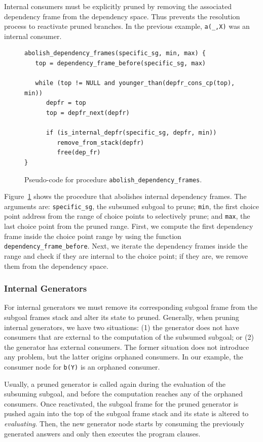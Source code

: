 Internal consumers must be explicitly pruned by removing the associated
dependency frame from the dependency space. Thus prevents the resolution process to reactivate pruned
branches. In the previous example, \texttt{a(\_,X)} was an internal consumer.

\begin{figure}[ht]
\begin{Verbatim}
abolish_dependency_frames(specific_sg, min, max) {
   top = dependency_frame_before(specific_sg, max)

   while (top != NULL and younger_than(depfr_cons_cp(top), min))
      depfr = top
      top = depfr_next(depfr)

      if (is_internal_depfr(specific_sg, depfr, min))
         remove_from_stack(depfr)
         free(dep_fr)
}
\end{Verbatim}
\caption{Pseudo-code for procedure \texttt{abolish\_dependency\_frames}.}
\label{fig:abolish_dependency_frames}
\end{figure}
   
Figure~\ref{fig:abolish_dependency_frames} shows the procedure that abolishes internal dependency frames.
The arguments are: \texttt{specific\_sg}, the subsumed subgoal to prune; \texttt{min}, the first choice point address from the range of choice points to selectively prune; and \texttt{max}, the last choice point from the pruned range. First, we compute the first dependency frame inside the choice point range by using the function \texttt{dependency\_frame\_before}. Next, we iterate the dependency frames inside the range and check if they are internal to the choice point; if they are, we remove them from the dependency space.

\subsubsection{Internal Generators}

For internal generators we must remove its corresponding subgoal frame
from the subgoal frames stack and alter its state to pruned. Generally, when pruning internal generators, we
have two situations: (1) the generator does not have consumers that are external to the computation of the
subsumed subgoal; or (2) the generator has external consumers. The former situation does not introduce any
problem, but the latter origins orphaned consumers. In our example, the consumer node for \texttt{b(Y)} is
an orphaned consumer.

Usually, a pruned generator is called again during the evaluation of the subsuming subgoal, and before
the computation reaches any of the orphaned consumers. Once reactivated, the subgoal frame for the pruned
generator is pushed again into the top of the subgoal frame stack and its state is altered to
\textit{evaluating}. Then, the new generator node starts by consuming the previously generated answers
and only then executes the program clauses.

